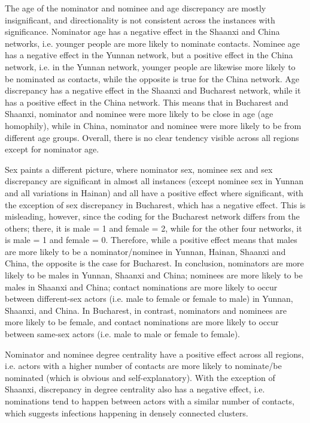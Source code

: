 The age of the nominator and nominee and age discrepancy are mostly insignificant, and directionality is not consistent across the instances with significance. Nominator age has a negative effect in the Shaanxi and China networks, i.e. younger people are more likely to nominate contacts. Nominee age has a negative effect in the Yunnan network, but a positive effect in the China network, i.e. in the Yunnan network, younger people are likewise more likely to be nominated as contacts, while the opposite is true for the China network. Age discrepancy has a negative effect in the Shaanxi and Bucharest network, while it has a positive effect in the China network. This means that in Bucharest and Shaanxi, nominator and nominee were more likely to be close in age (age homophily), while in China, nominator and nominee were more likely to be from different age groups. Overall, there is no clear tendency visible across all regions except for nominator age.

Sex paints a different picture, where nominator sex, nominee sex and sex discrepancy are significant in almost all instances (except nominee sex in Yunnan and all variations in Hainan) and all have a positive effect where significant, with the exception of sex discrepancy in Bucharest, which has a negative effect. This is misleading, however, since the coding for the Bucharest network differs from the others; there, it is male = 1 and female = 2, while for the other four networks, it is male = 1 and female = 0. Therefore, while a positive effect means that males are more likely to be a nominator/nominee in Yunnan, Hainan, Shaanxi and China, the opposite is the case for Bucharest. In conclusion, nominators are more likely to be males in Yunnan, Shaanxi and China; nominees are more likely to be males in Shaanxi and China; contact nominations are more likely to occur between different-sex actors (i.e. male to female or female to male) in Yunnan, Shaanxi, and China. In Bucharest, in contrast, nominators and nominees are more likely to be female, and contact nominations are more likely to occur between same-sex actors (i.e. male to male or female to female).

Nominator and nominee degree centrality have a positive effect across all regions, i.e. actors with a higher number of contacts are more likely to nominate/be nominated (which is obvious and self-explanatory). With the exception of Shaanxi, discrepancy in degree centrality also has a negative effect, i.e. nominations tend to happen between actors with a similar number of contacts, which suggests infections happening in densely connected clusters. 


